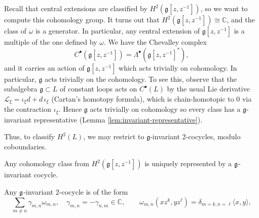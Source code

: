 \documentclass[12pt]{article}
\begin{document}
Recall that central extensions are classified by $H^2(\mathfrak{g}[z,z^{-1}])$, so we want to compute this cohomology group. It turns out that $H^2(\mathfrak{g}[z,z^{-1}]) \cong \mathbb{C}$, and the class of $\omega$ is a generator. In particular, any central extension of $\mathfrak{g}[z,z^{-1}]$ is a multiple of the one defined by $\omega$. We have the Chevalley complex
\[
    C^\bullet(\mathfrak{g}[z,z^{-1}]) = \Lambda^\bullet(\mathfrak{g}[z,z^{-1}]^*),
\]
and it carries an action of $\mathfrak{g}[z,z^{-1}]$ which acts trivially on cohomology. In particular, $\mathfrak{g}$ acts trivially on the cohomology.
To see this, observe that the subalgebra $\mathfrak g\subset L$ of constant loops acts on $C^\bullet(L)$ by the usual Lie derivative
$\mathcal L_\xi = \iota_\xi d + d\,\iota_\xi$ (Cartan's homotopy formula), which is chain-homotopic to 0 via the contraction $\iota_\xi$.
Hence $\mathfrak g$ acts trivially on cohomology so every class has a $\mathfrak g$-invariant representative (Lemma \ref{lem:invariant-representative}).

Thus, to classify $H^2(L)$, we may restrict to $\mathfrak g$-invariant 2-cocycles, modulo coboundaries.

\begin{proposition}
    Any cohomology class from $H^2(\mathfrak{g}[z,z^{-1}])$ is uniquely represented by a $\mathfrak{g}$-invariant cocycle.

    Any $\mathfrak{g}$-invariant 2-cocycle is of the form
    \[
        \sum_{m\neq n} \gamma_{m,n} \omega_{m,n}, \quad
        \gamma_{m,n} = -\gamma_{n,m} \in \mathbb{C}, \qquad
        \omega_{m,n}(xz^k, yz^\ell) = \delta_{m=k,n=\ell} \langle x,y\rangle,
    \]
\end{proposition}
\end{document}
